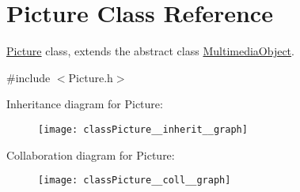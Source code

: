 \hypertarget{classPicture}{}\section{Picture Class Reference}
\label{classPicture}


\hyperlink{classPicture}{Picture} class, extends the abstract class \hyperlink{classMultimediaObject}{Multimedia\+Object}.  




{\ttfamily \#include $<$Picture.\+h$>$}



Inheritance diagram for Picture\+:
\nopagebreak
\begin{figure}[H]
\begin{center}
\leavevmode
\texttt{[image: classPicture\_\_inherit\_\_graph]}
\end{center}
\end{figure}


Collaboration diagram for Picture\+:
\nopagebreak
\begin{figure}[H]
\begin{center}
\leavevmode
\texttt{[image: classPicture\_\_coll\_\_graph]}
\end{center}
\end{figure}
